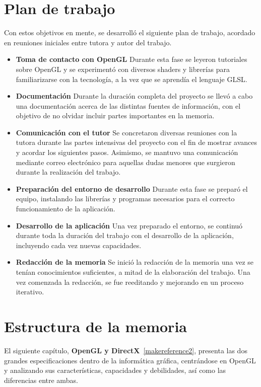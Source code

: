 \section{Plan de trabajo}
\label{makereference1.3}
Con estos objetivos en mente, se desarrolló el siguiente plan de trabajo,
acordado en reuniones iniciales entre tutora y autor del trabajo.

\begin{itemize}
		\item \textbf{Toma de contacto con OpenGL} Durante esta fase se leyeron
				tutoriales sobre OpenGL y se experimentó con diversos shaders y
				librerías para familiarizarse con la tecnología, a la vez que se
				aprendía el lenguaje GLSL.
		\item \textbf{Documentación} Durante la duración completa del proyecto
				se llevó a cabo una documentación acerca de las distintas
				fuentes de información, con el objetivo de no olvidar incluir
				partes importantes en la memoria.
		\item \textbf{Comunicación con el tutor} Se concretaron diversas
				reuniones con la tutora durante las partes intensivas del
				proyecto con el fin de mostrar avances y acordar los siguientes
				pasos. Asimismo, se mantuvo una comunicación mediante correo
				electrónico para aquellas dudas menores que surgieron durante la
				realización del trabajo.
		\item \textbf{Preparación del entorno de desarrollo} Durante esta fase
				se preparó el equipo, instalando las librerías y programas
				necesarios para el correcto funcionamiento de la aplicación.
		\item \textbf{Desarrollo de la aplicación} Una vez preparado el entorno,
				se continuó durante toda la duración del trabajo con el
				desarrollo de la aplicación, incluyendo cada vez nuevas
				capacidades.
		\item \textbf{Redacción de la memoria} Se inició la redacción de la
				memoria una vez se tenían conocimientos suficientes, a mitad de
				la elaboración del trabajo. Una vez comenzada la redacción, se
				fue reeditando y mejorando en un proceso iterativo.
\end{itemize}

\section{Estructura de la memoria}
\label{makereference1.4}

El siguiente capítulo, \textbf{OpenGL y DirectX}~\ref{makereference2}, presenta
las dos grandes especificaciones dentro de la informática gráfica, centrándose
en OpenGL y analizando sus características, capacidades y debilidades, así como
las diferencias entre ambas.\\

